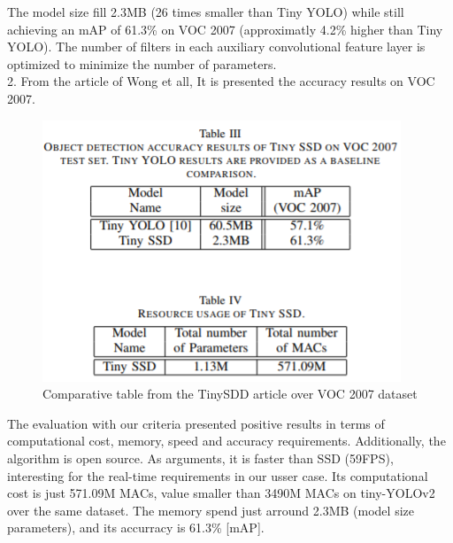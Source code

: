 \documentclass[10pt]{article}
\begin{document}
The model size fill 2.3MB (26 times smaller than Tiny YOLO) while still achieving an mAP of 61.3\% on VOC 2007 (approximatly 4.2\% higher than Tiny YOLO). The number of filters in each auxiliary convolutional feature layer is optimized to minimize the number of parameters.\\

2. 
From the article of Wong et all, It is presented the accuracy results on VOC 2007. \cite{wong2018tiny} 

\begin{figure}[H]
  	\centering
    \includegraphics[scale=0.7]{TablaTinySSD.PNG}
    \caption{Comparative table from the TinySDD article over VOC 2007 dataset \cite{wong2018tiny}}
\end{figure} 

The evaluation with our criteria presented positive results in terms of computational cost, memory, speed and accuracy requirements. Additionally, the algorithm is open source. As arguments, it is faster than SSD (59FPS), interesting for the real-time requirements in our usser case. Its computational cost is just 571.09M MACs, value smaller than 3490M MACs on tiny-YOLOv2\cite{wang2018pelee} over the same dataset. The memory spend just arround 2.3MB (model size parameters), and its accurracy is 61.3\% [mAP]. \\
\end{document}
